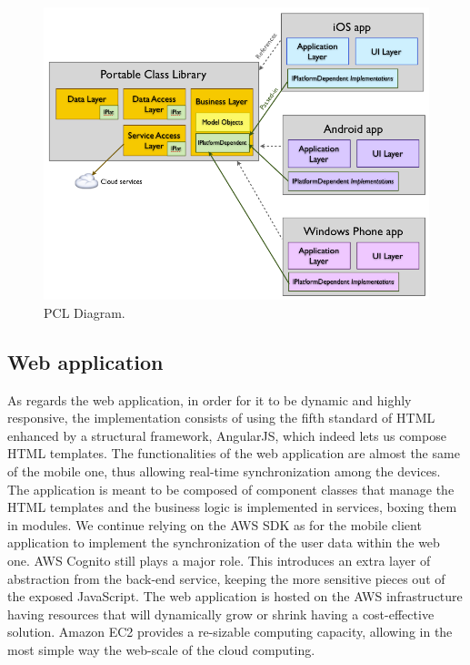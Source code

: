 \begin{figure}
	\centering
	\includegraphics[width=6in]{diagrams/PCLDiagram.png} 
	\caption{PCL Diagram\cite{pcl}.}
	\label{fig:pcld}
\end{figure}

\subsection*{Web application}
As regards the web application, in order for it to be dynamic and highly responsive, the implementation consists of using the fifth standard of HTML enhanced by a structural framework, AngularJS, which indeed lets us compose HTML templates. The functionalities of the web application are almost the same of the mobile one, thus allowing real-time synchronization among the devices. The application is meant to be composed of component classes that manage the HTML templates and the business logic is implemented in services, boxing them in modules. We continue relying on the AWS SDK as for the mobile client application to implement the synchronization of the user data within the web one. 
AWS Cognito still plays a major role. This introduces an extra layer of abstraction from the back-end service, keeping the more sensitive pieces out of the exposed JavaScript.
The web application is hosted on the AWS infrastructure having resources that will dynamically grow or shrink having a cost-effective solution. Amazon EC2 provides a re-sizable computing capacity, allowing in the most simple way the web-scale of the cloud computing.

